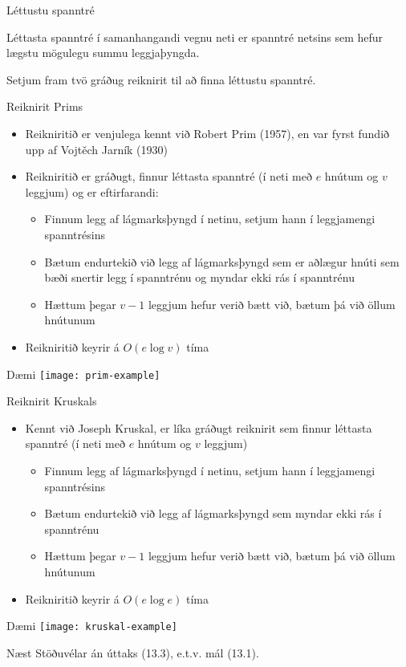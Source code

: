 \documentclass[handout]{beamer}
\begin{document}
\begin{frame}{Léttustu spanntré}
\begin{tcolorbox}[title=Léttustu spanntré]
Léttasta spanntré í samanhangandi vegnu neti er spanntré netsins sem hefur lægstu mögulegu summu leggjaþyngda.
\end{tcolorbox}
Setjum fram tvö gráðug reiknirit til að finna léttustu spanntré.
\end{frame}

\begin{frame}{Reiknirit Prims}
\begin{itemize}
 \item Reikniritið er venjulega kennt við Robert Prim (1957), en var fyrst fundið upp af Vojtěch Jarník (1930)
 \item Reikniritið er gráðugt, finnur léttasta spanntré (í neti með $e$ hnútum og $v$ leggjum) og er eftirfarandi:
 \begin{itemize}
  \item Finnum legg af lágmarksþyngd í netinu, setjum hann í leggjamengi spanntrésins
  \item Bætum endurtekið við legg af lágmarksþyngd sem er aðlægur hnúti sem bæði snertir legg í spanntrénu og myndar ekki rás í spanntrénu
  \item Hættum þegar $v-1$ leggjum hefur verið bætt við, bætum þá við öllum hnútunum
 \end{itemize}
 \item Reikniritið keyrir á $O(e \log v)$ tíma
\end{itemize}
\end{frame}

\begin{frame}{Dæmi}
    \texttt{[image: prim-example]}
\end{frame}

\begin{frame}{Reiknirit Kruskals}
\begin{itemize}
 \item Kennt við Joseph Kruskal, er líka gráðugt reiknirit sem finnur léttasta spanntré (í neti með $e$ hnútum og $v$ leggjum)
 \begin{itemize}
  \item Finnum legg af lágmarksþyngd í netinu, setjum hann í leggjamengi spanntrésins
  \item Bætum endurtekið við legg af lágmarksþyngd sem myndar ekki rás í spanntrénu
  \item Hættum þegar $v-1$ leggjum hefur verið bætt við, bætum þá við öllum hnútunum
 \end{itemize}
 \item Reikniritið keyrir á $O(e \log e)$ tíma
\end{itemize}
\end{frame}

\begin{frame}{Dæmi}
    \texttt{[image: kruskal-example]}
\end{frame}

\begin{frame}{Næst}
Stöðuvélar án úttaks (13.3), e.t.v. mál (13.1).
\end{frame}
\end{document}
